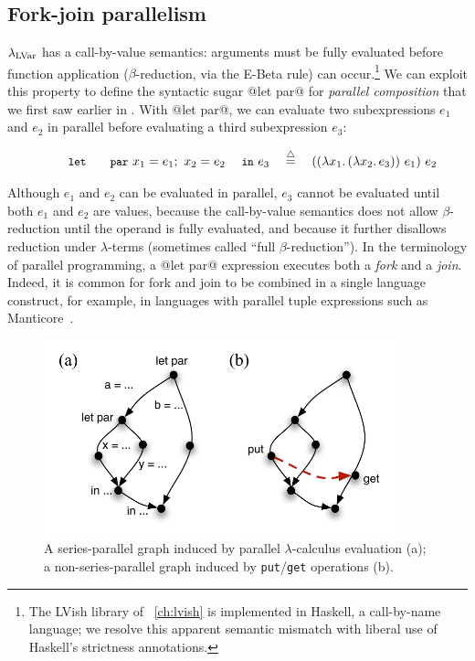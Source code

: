 \subsection{Fork-join parallelism}\label{subsection:fork-join}

$\lambda_{\textrm{LVar}}$ has a call-by-value semantics: arguments must be fully
evaluated before function application ($\beta$-reduction, via the {\sc
  E-Beta} rule) can occur.\footnote{The LVish library of
  ~\ref{ch:lvish} is implemented in Haskell,
  a call-by-name language; we resolve this apparent semantic mismatch
  with liberal use of Haskell's strictness annotations.}
We can exploit this property to define the syntactic sugar @let par@
for \emph{parallel composition} that we first saw earlier in
.  With @let par@, we can evaluate two
subexpressions $e_1$ and $e_2$ in parallel before evaluating a third
subexpression $e_3$:

\vspace{-8mm}
\singlespacing
\begin{displaymath}
\letparexp{x_1}{e_1}{x_2}{e_2}{e_3} \quad\defeq\quad \app{(\app{(\lam{x_1}{(\lam{x_2}{e_3})})}{e_1})}{e_2}
\end{displaymath}
\doublespacing

Although $e_1$ and $e_2$ can be evaluated in parallel, $e_3$ cannot be
evaluated until both $e_1$ and $e_2$ are values, because the
call-by-value semantics does not allow $\beta$-reduction until the
operand is fully evaluated, and because it further disallows reduction
under $\lambda$-terms (sometimes called ``full $\beta$-reduction'').
In the terminology of parallel programming, a @let par@ expression
executes both a \emph{fork} and a \emph{join}.  Indeed, it is common
for fork and join to be combined in a single language construct, for
example, in languages with parallel tuple expressions such as
Manticore~\cite{manticore_parallel_tuples}.

\begin{figure}[tb]
  \centering 
\includegraphics[width=4in]{chapter2/figures/lvars-series-parallel.pdf} 
\caption{A series-parallel graph induced by parallel
  $\lambda$-calculus evaluation (a); a non-series-parallel graph
  induced by \lstinline|put|/\lstinline|get| operations (b).}
  \label{f:lvars-series-parallel}
\end{figure}

